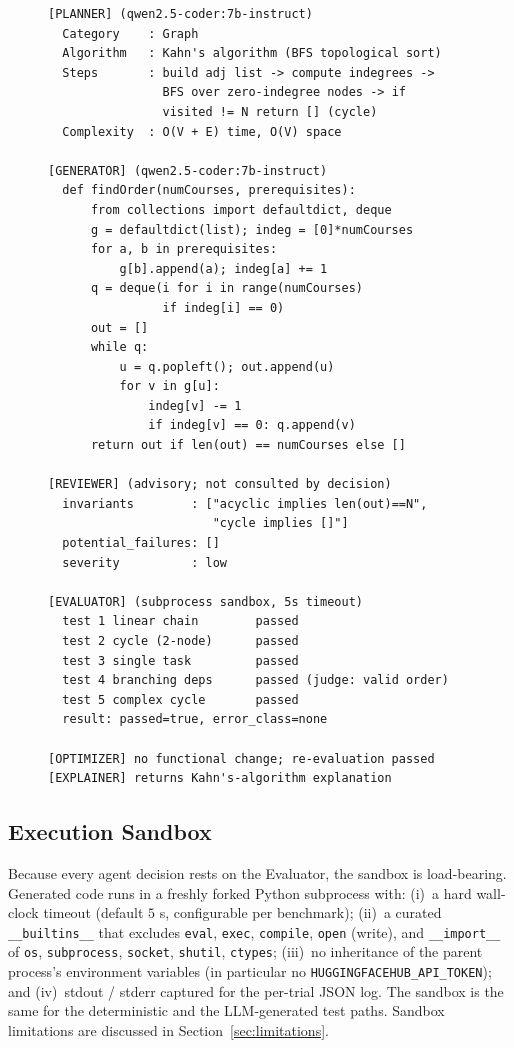 \documentclass[journal]{IEEEtran}
\begin{document}
\begin{figure}[t]
\begin{lstlisting}[caption={Per-agent trace for the \texttt{topo\_sort} problem (truncated for space). Acceptance is decided by the Evaluator's \texttt{passed:true}; the Reviewer's verdict is recorded but not consulted.},label={lst:trace}]
[PLANNER] (qwen2.5-coder:7b-instruct)
  Category    : Graph
  Algorithm   : Kahn's algorithm (BFS topological sort)
  Steps       : build adj list -> compute indegrees ->
                BFS over zero-indegree nodes -> if
                visited != N return [] (cycle)
  Complexity  : O(V + E) time, O(V) space

[GENERATOR] (qwen2.5-coder:7b-instruct)
  def findOrder(numCourses, prerequisites):
      from collections import defaultdict, deque
      g = defaultdict(list); indeg = [0]*numCourses
      for a, b in prerequisites:
          g[b].append(a); indeg[a] += 1
      q = deque(i for i in range(numCourses)
                if indeg[i] == 0)
      out = []
      while q:
          u = q.popleft(); out.append(u)
          for v in g[u]:
              indeg[v] -= 1
              if indeg[v] == 0: q.append(v)
      return out if len(out) == numCourses else []

[REVIEWER] (advisory; not consulted by decision)
  invariants        : ["acyclic implies len(out)==N",
                       "cycle implies []"]
  potential_failures: []
  severity          : low

[EVALUATOR] (subprocess sandbox, 5s timeout)
  test 1 linear chain        passed
  test 2 cycle (2-node)      passed
  test 3 single task         passed
  test 4 branching deps      passed (judge: valid order)
  test 5 complex cycle       passed
  result: passed=true, error_class=none

[OPTIMIZER] no functional change; re-evaluation passed
[EXPLAINER] returns Kahn's-algorithm explanation
\end{lstlisting}
\end{figure}

\subsection{Execution Sandbox}\label{sec:sandbox}
Because every agent decision rests on the Evaluator, the sandbox is load-bearing. Generated code runs in a freshly forked Python subprocess with: (i)~a hard wall-clock timeout (default $5$ s, configurable per benchmark); (ii)~a curated \texttt{\_\_builtins\_\_} that excludes \texttt{eval}, \texttt{exec}, \texttt{compile}, \texttt{open} (write), and \texttt{\_\_import\_\_} of \texttt{os}, \texttt{subprocess}, \texttt{socket}, \texttt{shutil}, \texttt{ctypes}; (iii)~no inheritance of the parent process's environment variables (in particular no \texttt{HUGGINGFACEHUB\_API\_TOKEN}); and (iv)~stdout / stderr captured for the per-trial JSON log. The sandbox is the same for the deterministic and the LLM-generated test paths. Sandbox limitations are discussed in Section~\ref{sec:limitations}.
\end{document}
